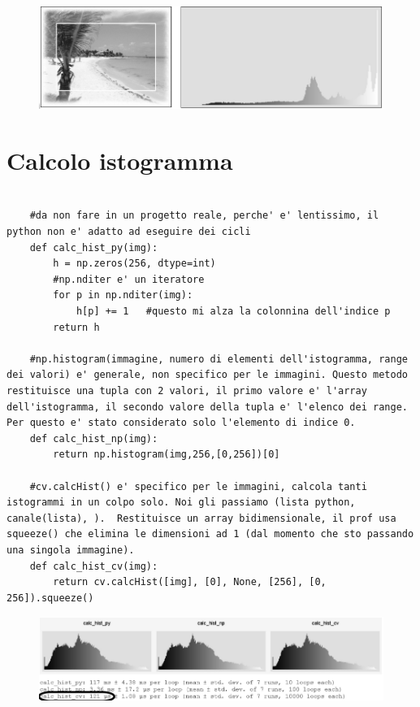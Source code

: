 \begin{figure}[htp]
	\includegraphics[width=\linewidth]{./immagini/istogramma_spiaggia.png}
	\label{img:istogramma_spiaggia}
\end{figure}


\section{Calcolo istogramma}

\begin{lstlisting}
	
	#da non fare in un progetto reale, perche' e' lentissimo, il python non e' adatto ad eseguire dei cicli
	def calc_hist_py(img):
		h = np.zeros(256, dtype=int)
		#np.nditer e' un iteratore
		for p in np.nditer(img):
			h[p] += 1	#questo mi alza la colonnina dell'indice p
		return h
	
	#np.histogram(immagine, numero di elementi dell'istogramma, range dei valori) e' generale, non specifico per le immagini. Questo metodo restituisce una tupla con 2 valori, il primo valore e' l'array dell'istogramma, il secondo valore della tupla e' l'elenco dei range. Per questo e' stato considerato solo l'elemento di indice 0.
	def calc_hist_np(img):
		return np.histogram(img,256,[0,256])[0]
	
	#cv.calcHist() e' specifico per le immagini, calcola tanti istogrammi in un colpo solo. Noi gli passiamo (lista python, canale(lista), ).  Restituisce un array bidimensionale, il prof usa squeeze() che elimina le dimensioni ad 1 (dal momento che sto passando una singola immagine).
	def calc_hist_cv(img):
		return cv.calcHist([img], [0], None, [256], [0, 256]).squeeze()
\end{lstlisting}

\begin{figure}[htp]
	\includegraphics[width=\linewidth]{./immagini/istogrammi.png}
	\label{img:istogrammi}
\end{figure}

